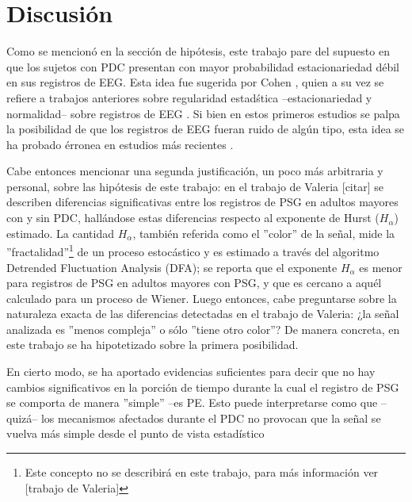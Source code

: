 \section{Discusi\'on}

Como se mencion\'o en la secci\'on de hip\'otesis, este trabajo pare del supuesto en que los
sujetos con PDC presentan con mayor probabilidad estacionariedad d\'ebil en sus registros de EEG.
Esta idea fue sugerida por Cohen \cite{Cohen77}, quien a su vez se refiere a trabajos anteriores
sobre regularidad estad\'stica --estacionariedad y normalidad-- sobre registros de 
EEG \cite{McEwen75,Sugimoto78,Kawabata73}. 
Si bien en estos primeros estudios se palpa la posibilidad de que los registros de EEG fueran
ruido de alg\'un tipo, esta idea se ha probado \'erronea en estudios m\'as recientes 
\cite{Klonowski09}.

Cabe entonces mencionar una segunda justificaci\'on, un poco m\'as arbitraria y personal, sobre
las hip\'otesis de este trabajo: en el trabajo de Valeria [citar] se describen
diferencias significativas entre los registros de PSG en adultos mayores con y sin PDC,
hall\'andose estas diferencias respecto
al exponente de Hurst ($H_\alpha$) estimado.
La cantidad $H_\alpha$, tambi\'en referida como el ''color'' de la se\~nal,
mide la ''fractalidad''\footnote{Este concepto no se
describir\'a en este trabajo, para m\'as informaci\'on ver [trabajo de Valeria]} 
de un proceso estoc\'astico y es estimado a trav\'es del
algoritmo Detrended Fluctuation Analysis (DFA); se reporta
que el exponente $H_\alpha$ es menor para registros de PSG en adultos mayores con PSG, y que es
cercano a aqu\'el calculado para un proceso de Wiener. 
Luego entonces, cabe preguntarse sobre la naturaleza exacta de las diferencias detectadas en 
el trabajo de Valeria: ¿la se\~nal analizada es ''menos compleja'' o 
s\'olo ''tiene otro color''?
De manera concreta, en este trabajo se ha hipotetizado sobre la primera posibilidad.

En cierto modo, se ha aportado evidencias suficientes para decir que no hay cambios significativos
en la porci\'on de tiempo durante la cual el registro de PSG se comporta de manera ''simple''
--es PE. Esto puede interpretarse como que --quiz\'a-- los mecanismos afectados durante el PDC no 
provocan que la se\~nal se vuelva m\'as simple desde el punto de vista estad\'istico

